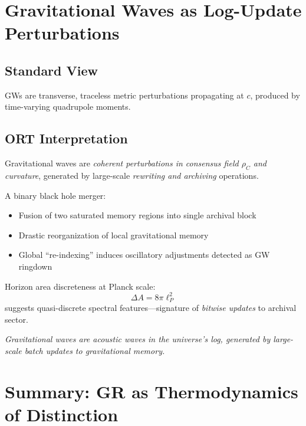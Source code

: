 \documentclass[12pt,a4paper]{article}
\begin{document}
\section{Gravitational Waves as Log-Update Perturbations}

\subsection{Standard View}

GWs are transverse, traceless metric perturbations propagating at $c$, produced by time-varying quadrupole moments.

\subsection{ORT Interpretation}

Gravitational waves are \emph{coherent perturbations in consensus field $\rho_C$ and curvature}, generated by large-scale \emph{rewriting and archiving} operations.

A binary black hole merger:
\begin{itemize}
    \item Fusion of two saturated memory regions into single archival block
    \item Drastic reorganization of local gravitational memory
    \item Global ``re-indexing'' induces oscillatory adjustments detected as GW ringdown
\end{itemize}

Horizon area discreteness at Planck scale:
\begin{equation}
    \Delta A = 8\pi \ell_P^2
\end{equation}
suggests quasi-discrete spectral features---signature of \emph{bitwise updates} to archival sector.

\begin{center}
\emph{Gravitational waves are acoustic waves in the universe's log, generated by large-scale batch updates to gravitational memory.}
\end{center}

\section{Summary: GR as Thermodynamics of Distinction}
\end{document}

